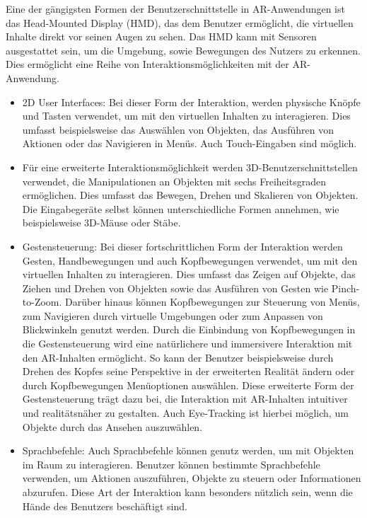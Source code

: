Eine der gängigsten Formen der Benutzerschnittstelle in AR-Anwendungen ist das
Head-Mounted Display (HMD), das dem Benutzer ermöglicht, die virtuellen Inhalte
direkt vor seinen Augen zu sehen. Das HMD kann mit Sensoren ausgestattet sein,
um die Umgebung, sowie Bewegungen des Nutzers zu erkennen. Dies ermöglicht eine
Reihe von Interaktionsmöglichkeiten mit der AR-Anwendung.
\begin{itemize}
      \item 2D User Interfaces: Bei dieser Form der Interaktion,
            werden physische Knöpfe und Tasten verwendet, um mit den virtuellen Inhalten zu interagieren.
            Dies umfasst beispielsweise das Auswählen von Objekten, das Ausführen von Aktionen oder das Navigieren in Menüs. Auch Touch-Eingaben sind möglich.

      \item Für eine erweiterte Interaktionsmöglichkeit werden 3D-Benutzerschnittstellen
            verwendet, die Manipulationen an Objekten mit sechs Freiheitsgraden
            ermöglichen. Dies umfasst das Bewegen, Drehen und Skalieren von Objekten. Die
            Eingabegeräte selbst können unterschiedliche Formen annehmen, wie
            beispielsweise 3D-Mäuse oder Stäbe.

      \item Gestensteuerung: Bei dieser fortschrittlichen Form der Interaktion werden
            Gesten, Handbewegungen und auch Kopfbewegungen verwendet, um mit den virtuellen
            Inhalten zu interagieren. Dies umfasst das Zeigen auf Objekte, das Ziehen und
            Drehen von Objekten sowie das Ausführen von Gesten wie Pinch-to-Zoom. Darüber
            hinaus können Kopfbewegungen zur Steuerung von Menüs, zum Navigieren durch
            virtuelle Umgebungen oder zum Anpassen von Blickwinkeln genutzt werden. Durch
            die Einbindung von Kopfbewegungen in die Gestensteuerung wird eine natürlichere
            und immersivere Interaktion mit den AR-Inhalten ermöglicht. So kann der
            Benutzer beispielsweise durch Drehen des Kopfes seine Perspektive in der
            erweiterten Realität ändern oder durch Kopfbewegungen Menüoptionen auswählen.
            Diese erweiterte Form der Gestensteuerung trägt dazu bei, die Interaktion mit
            AR-Inhalten intuitiver und realitätsnäher zu gestalten. Auch Eye-Tracking ist
            hierbei möglich, um Objekte durch das Ansehen auszuwählen.

      \item Sprachbefehle: Auch Sprachbefehle können genutz werden, um mit Objekten im Raum
            zu interagieren. Benutzer können bestimmte Sprachbefehle verwenden, um Aktionen
            auszuführen, Objekte zu steuern oder Informationen abzurufen. Diese Art der
            Interaktion kann besonders nützlich sein, wenn die Hände des Benutzers
            beschäftigt sind.
\end{itemize}

